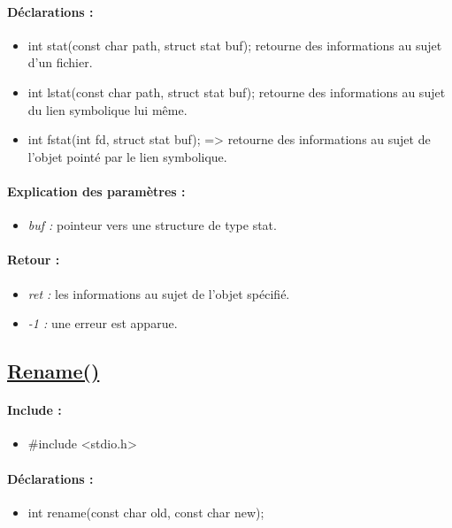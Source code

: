 \documentclass{article}[12pt]
\begin{document}
\paragraph{Déclarations : }
\begin{itemize}
	\item int stat(const char \* path, struct stat \* buf); retourne des informations au sujet d'un fichier.
	\item int lstat(const char \* path, struct stat \* buf); retourne des informations au sujet du lien symbolique lui même.
	\item int fstat(int fd, struct stat \* buf); => retourne des informations au sujet de l'objet pointé par le lien symbolique. 
\end{itemize}
\paragraph{Explication des paramètres : }
\begin{itemize}
	\item \emph{buf : } pointeur vers une structure de type stat.
\end{itemize}
\paragraph{Retour : }
\begin{itemize}
	\item \emph{ret : } les informations au sujet de l'objet spécifié. 
	\item \emph{-1 : } une erreur est apparue.
\end{itemize}
\subsection{\href{http://jp.barralis.com/linux-man/man2/rename.2.php}{Rename()}}
\paragraph{Include : }
\begin{itemize}
	\item \#include <stdio.h>
\end{itemize}
\paragraph{Déclarations : }
\begin{itemize}
	\item int rename(const char \* old, const char \* new);
\end{itemize}
\end{document}
